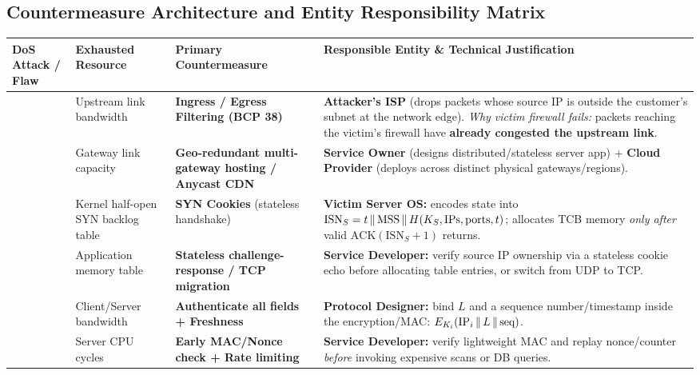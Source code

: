 \subsection{Countermeasure Architecture and Entity Responsibility Matrix}
\begin{table}[h!]
\centering
\footnotesize
\begin{tabularx}{\textwidth}{@{}L{3.1cm} L{2.7cm} L{3.4cm} Y@{}}
\toprule
\textbf{DoS Attack / Flaw} & \textbf{Exhausted Resource} & \textbf{Primary Countermeasure} & \textbf{Responsible Entity \& Technical Justification} \\
\midrule
{} & Upstream link bandwidth & \textbf{Ingress / Egress Filtering (BCP 38)} & \textbf{Attacker's ISP} (drops packets whose source IP is outside the customer's subnet at the network edge). \emph{Why victim firewall fails:} packets reaching the victim's firewall have \textbf{already congested the upstream link}. \\
 & Gateway link capacity & \textbf{Geo-redundant multi-gateway hosting / Anycast CDN} & \textbf{Service Owner} (designs distributed/stateless server app) $+$ \textbf{Cloud Provider} (deploys across distinct physical gateways/regions). \\
 & Kernel half-open SYN backlog table & \textbf{SYN Cookies} (stateless handshake) & \textbf{Victim Server OS:} encodes state into $\mathrm{ISN}_S = t \,\|\, \text{MSS} \,\|\, H(K_S, \text{IPs}, \text{ports}, t)$; allocates TCB memory \emph{only after} valid $\text{ACK}(\mathrm{ISN}_S+1)$ returns. \\
 & Application memory table & \textbf{Stateless challenge-response / TCP migration} & \textbf{Service Developer:} verify source IP ownership via a stateless cookie echo before allocating table entries, or switch from UDP to TCP. \\
 & Client/Server bandwidth & \textbf{Authenticate all fields + Freshness} & \textbf{Protocol Designer:} bind $L$ and a sequence number/timestamp inside the encryption/MAC: $E_{K_i}(\mathrm{IP}_i \,\|\, L \,\|\, \text{seq})$. \\
 & Server CPU cycles & \textbf{Early MAC/Nonce check + Rate limiting} & \textbf{Service Developer:} verify lightweight MAC and replay nonce/counter \emph{before} invoking expensive scans or DB queries. \\
\bottomrule
\end{tabularx}
\end{table}


